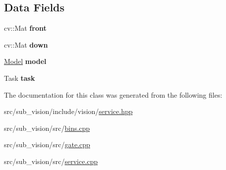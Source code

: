 \subsection*{Data Fields}
\begin{DoxyCompactItemize}
\item 
\mbox{\label{classVisionService_aab2728718c9697f322dc84914a670484}} 
cv\+::\+Mat {\bfseries front}
\item 
\mbox{\label{classVisionService_aea4889f5af8acdf4b6e222f67c58477b}} 
cv\+::\+Mat {\bfseries down}
\item 
\mbox{\label{classVisionService_aa0b7cb339423b293d576e69759a754bc}} 
\hyperlink{classModel}{Model} {\bfseries model}
\item 
\mbox{\label{classVisionService_a6089969c6dc3a41dc384b4963f6bd37a}} 
Task {\bfseries task}
\end{DoxyCompactItemize}


The documentation for this class was generated from the following files\+:\begin{DoxyCompactItemize}
\item 
src/sub\+\_\+vision/include/vision/\hyperlink{sub__vision_2include_2vision_2service_8hpp}{service.\+hpp}\item 
src/sub\+\_\+vision/src/\hyperlink{bins_8cpp}{bins.\+cpp}\item 
src/sub\+\_\+vision/src/\hyperlink{gate_8cpp}{gate.\+cpp}\item 
src/sub\+\_\+vision/src/\hyperlink{sub__vision_2src_2service_8cpp}{service.\+cpp}\end{DoxyCompactItemize}
